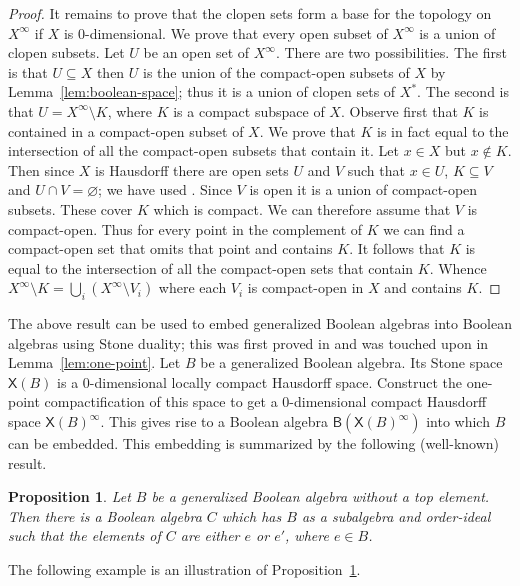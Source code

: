\documentclass[a4paper]{amsart}
\newtheorem{proposition}[theorem]{Proposition}
\begin{document}
\begin{proof}
It remains to prove that the clopen sets form a base for the topology on $X^{\infty}$ if 
$X$ is $0$-dimensional.
We prove that every open subset of $X^{\infty}$ is a union of clopen subsets.
Let $U$ be an open set of $X^{\infty}$.
There are two possibilities.
The first is that $U \subseteq X$ then $U$ is the union of the compact-open subsets of $X$ by Lemma~\ref{lem:boolean-space};
thus it is a union of clopen sets of $X^{\ast}$.
The second is that $U = X^{\infty} \setminus K$, where $K$ is a compact subspace of $X$.
Observe first that $K$ is contained in a compact-open subset of $X$.
We prove that $K$ is in fact equal to the intersection of all the compact-open subsets that contain it.
Let $x \in X$ but $x \notin K$.
Then since $X$ is Hausdorff there are open sets $U$ and $V$ such that
$x \in U$, $K \subseteq V$ and $U \cap V = \varnothing$;
we have used \cite[Theorem 26.C]{Simmons}.
Since $V$ is open it is a union of compact-open subsets.
These cover $K$ which is compact.
We can therefore assume that $V$ is compact-open.
Thus for every point in the complement of $K$ we can find a compact-open set that omits that point and contains $K$.
It follows that $K$ is equal to the intersection of all the compact-open sets that contain $K$.
Whence $X^{\infty} \setminus K = \bigcup_{i} (X^{\infty} \setminus V_{i})$
where each $V_{i}$ is compact-open in $X$ and contains $K$.
\end{proof}

The above result can be used to embed generalized Boolean algebras into Boolean algebras using Stone duality;
this was first proved in \cite{Stone1937} and was touched upon in Lemma~\ref{lem:one-point}.
Let $B$ be a generalized Boolean algebra.
Its Stone space $\mathsf{X}(B)$ is a $0$-dimensional locally compact Hausdorff space.
Construct the one-point compactification of this space to get a $0$-dimensional compact Hausdorff space $\mathsf{X}(B)^{\infty}$.
This gives rise to a Boolean algebra $\mathsf{B}(\mathsf{X}(B)^{\infty})$ into which $B$ can be embedded.
This embedding is summarized by the following (well-known) result.

\begin{proposition}\label{prop:gen-into-unital} Let $B$ be a generalized Boolean algebra without a top element.
Then there is a Boolean algebra $C$ which has $B$ as a subalgebra and order-ideal such that
the elements of $C$ are either $e$ or $e'$, where $e \in B$. 
\end{proposition}

The following example is an illustration of Proposition~\ref{prop:gen-into-unital}.
\end{document}
